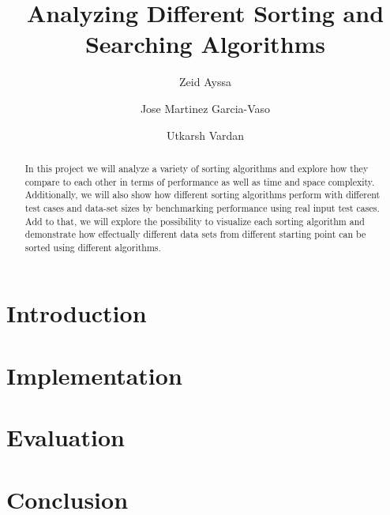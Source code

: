 \documentclass[sigconf,table]{acmart}
\begin{document}
\title{Analyzing Different Sorting and Searching Algorithms}

\author{Zeid Ayssa}

\author{Jose Martinez Garcia-Vaso}

\author{Utkarsh Vardan}

\begin{abstract}
In this project we will analyze a variety of sorting algorithms and explore how they compare to each other in terms of performance as well as time and space complexity. Additionally, we will also show how different sorting algorithms perform with different test cases and data-set sizes by benchmarking performance using real input test cases. Add to that, we will explore the possibility to visualize each sorting algorithm and demonstrate how effectually different data sets from different starting point can be sorted using different algorithms.

\end{abstract}

\maketitle

\section{Introduction}



\section{Implementation}


\section{Evaluation}


\clearpage

\section{Conclusion}


\begin{comment}
\section{Future Work}

\end{comment}



\end{document}
